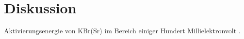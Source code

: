 \section{Diskussion}

Aktivierungsenergie von KBr(Sr) im Bereich einiger Hundert Millielektronvolt \cite{KBr-Sr}.

\printbibliography
